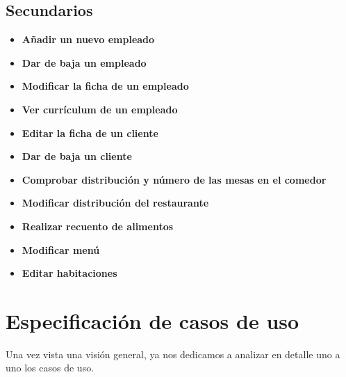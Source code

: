 \documentclass[spanish,a4paper,12pt]{report}		%
\begin{document}
\subsection{Secundarios}			%
	\begin{itemize}
	\item \textbf{Añadir un nuevo empleado}
	\item \textbf{Dar de baja un empleado}
	\item \textbf{Modificar la ficha de un empleado}
	\item \textbf{Ver currículum de un empleado}
	\item \textbf{Editar la ficha de un cliente}
	\item \textbf{Dar de baja un cliente}
	\item \textbf{Comprobar distribución y número de las mesas en el comedor}
	\item \textbf{Modificar distribución del restaurante}
	\item \textbf{Realizar recuento de alimentos}
	\item \textbf{Modificar menú}
	\item \textbf{Editar habitaciones}

	\end{itemize}



\newpage
\section{Especificación de casos de uso}	%
Una vez vista una visión general, ya nos dedicamos a analizar en detalle uno a uno los casos de uso.
\end{document}
